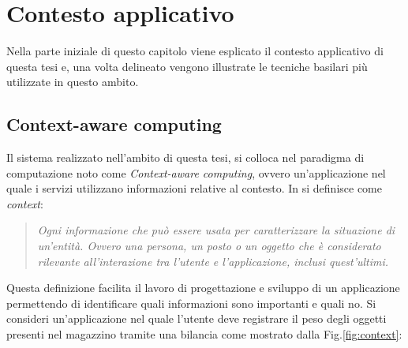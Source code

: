 \chapter{Contesto applicativo }
\label{contesto}
Nella parte iniziale di questo capitolo viene esplicato il contesto applicativo di questa tesi e, una volta delineato vengono illustrate le tecniche basilari più utilizzate in questo ambito.

\section{Context-aware computing}
\label{context-aware}
Il sistema realizzato nell'ambito di questa tesi, si colloca nel paradigma di computazione noto come \textit{Context-aware computing}, ovvero un'applicazione nel quale i servizi utilizzano informazioni relative al contesto. In \cite{context} si definisce come \textit{context}:

\begin{quotation}
\textit{Ogni informazione che può essere usata per caratterizzare la situazione di un'entità. Ovvero una persona, un posto o un oggetto che è considerato rilevante all'interazione tra l'utente e l'applicazione, inclusi quest'ultimi.}
\end{quotation}

Questa definizione facilita il lavoro di progettazione e sviluppo di un applicazione permettendo di identificare quali informazioni sono importanti e quali no.
Si consideri un'applicazione nel quale l'utente deve registrare il peso degli oggetti presenti nel magazzino tramite una bilancia come mostrato dalla Fig.\ref{fig:context}:

